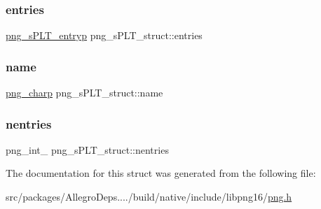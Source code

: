 \subsubsection{\texorpdfstring{entries}{entries}}
{\footnotesize\ttfamily \hyperlink{libpng16_2png_8h_a876dffcd144a34db6e32f9648f032d6e}{png\+\_\+s\+P\+L\+T\+\_\+entryp} png\+\_\+s\+P\+L\+T\+\_\+struct\+::entries}

\mbox{\label{structpng__s_p_l_t__struct_af3b088b149e790b9b98ebedde69a70f0}} 
\subsubsection{\texorpdfstring{name}{name}}
{\footnotesize\ttfamily \hyperlink{libpng16_2pngconf_8h_a0d08bb02251d02830803ff5d2d449750}{png\+\_\+charp} png\+\_\+s\+P\+L\+T\+\_\+struct\+::name}

\mbox{\label{structpng__s_p_l_t__struct_ac5844e98e4c43733bad6b83b54dc7a9f}} 
\subsubsection{\texorpdfstring{nentries}{nentries}}
{\footnotesize\ttfamily png\+\_\+int\+\_ png\+\_\+s\+P\+L\+T\+\_\+struct\+::nentries}



The documentation for this struct was generated from the following file\+:\begin{DoxyCompactItemize}
\item 
src/packages/\+Allegro\+Deps..../build/native/include/libpng16/\hyperlink{libpng16_2png_8h}{png.\+h}\end{DoxyCompactItemize}
